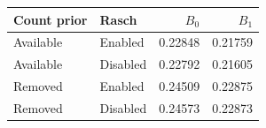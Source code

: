 \begin{tabular}{llrr}
\toprule
Count prior & Rasch & $B_0$ & $B_1$\\
\midrule
Available & Enabled & 0.22848 & 0.21759\\
Available & Disabled & 0.22792 & 0.21605\\
Removed & Enabled & 0.24509 & 0.22875\\
Removed & Disabled & 0.24573 & 0.22873\\
\bottomrule
\end{tabular}
